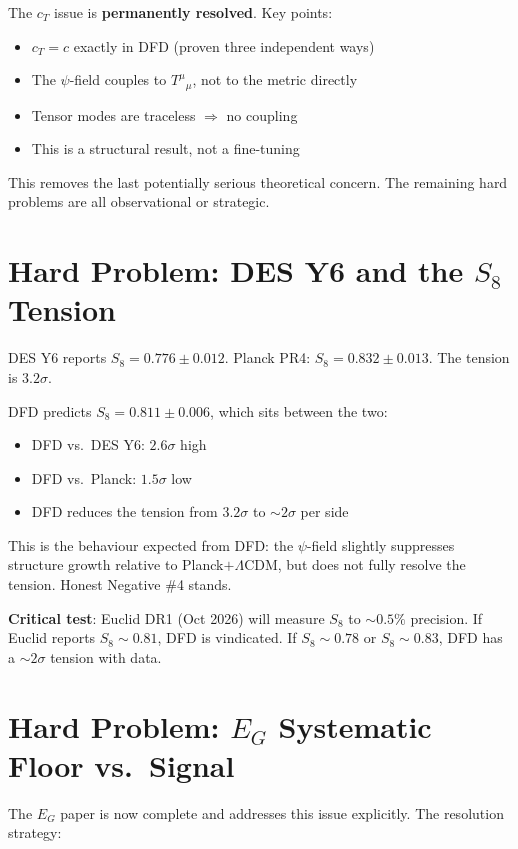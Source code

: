 \documentclass[11pt,a4paper]{article}
\begin{document}
The $c_T$ issue is \textbf{permanently resolved}. Key points:
\begin{itemize}[nosep]
\item $c_T = c$ exactly in DFD (proven three independent ways)
\item The $\psi$-field couples to $T^\mu{}_\mu$, not to the metric directly
\item Tensor modes are traceless $\Rightarrow$ no coupling
\item This is a structural result, not a fine-tuning
\end{itemize}

This removes the last potentially serious theoretical concern. The remaining hard problems are all observational or strategic.

\section{Hard Problem: DES Y6 and the $S_8$ Tension}

DES Y6 reports $S_8 = 0.776 \pm 0.012$. Planck PR4: $S_8 = 0.832 \pm 0.013$. The tension is $3.2\sigma$.

DFD predicts $S_8 = 0.811 \pm 0.006$, which sits between the two:
\begin{itemize}[nosep]
\item DFD vs.\ DES Y6: $2.6\sigma$ high
\item DFD vs.\ Planck: $1.5\sigma$ low
\item DFD reduces the tension from $3.2\sigma$ to $\sim 2\sigma$ per side
\end{itemize}

This is the behaviour expected from DFD: the $\psi$-field slightly suppresses structure growth relative to Planck$+\Lambda$CDM, but does not fully resolve the tension. Honest Negative \#4 stands.

\textbf{Critical test}: Euclid DR1 (Oct 2026) will measure $S_8$ to $\sim 0.5\%$ precision. If Euclid reports $S_8 \sim 0.81$, DFD is vindicated. If $S_8 \sim 0.78$ or $S_8 \sim 0.83$, DFD has a $\sim 2\sigma$ tension with data.

\section{Hard Problem: $E_G$ Systematic Floor vs.\ Signal}

The $E_G$ paper is now complete and addresses this issue explicitly. The resolution strategy:
\end{document}
